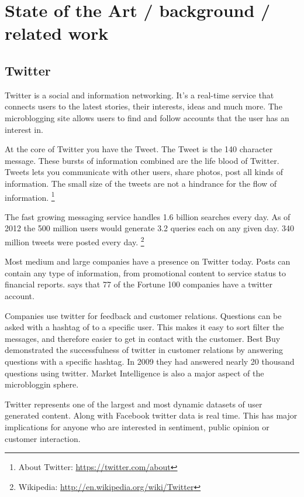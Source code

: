 \section{State of the Art / background / related work}

\subsection{Twitter}
Twitter is a social and information networking. It's a real-time service that
connects users to the latest stories, their interests, ideas and much more. The
microblogging site allows users to find and follow accounts that the user has
an interest in. 

At the core of Twitter you have the Tweet. The Tweet is the 140 character
message. These bursts of information combined are the life blood of Twitter.
Tweets lets you communicate with other users, share photos, post all kinds of
information. The small size of the tweets are not a hindrance for the flow of
information. 
\footnote{About Twitter: \url{https://twitter.com/about}}

The fast growing messaging service handles 1.6 billion searches every day.
As of 2012 the 500 million users would generate 3.2 queries each on any given
day. 340 million tweets were posted every day. 
\footnote{Wikipedia: \url{http://en.wikipedia.org/wiki/Twitter}} 

Most medium and large companies have a presence on Twitter today. Posts can contain
any type of information, from promotional content to service status to
financial reports. \cite[p8]{annikajubbega11:twitter_driver_stock_price} says
that 77 of the Fortune 100 companies have a twitter account. 

Companies use twitter for feedback and customer relations. Questions can be
asked with a hashtag of to a specific user. This makes it easy to sort filter
the messages, and therefore easier to get in contact with the customer. Best
Buy demonstrated the successfulness of twitter in customer relations by
answering questions with a specific hashtag. In 2009 they had answered nearly
20 thousand questions using twitter. \cite[p1]{Li2013206}
Market Intelligence is also a major aspect of the microbloggin sphere.

Twitter represents one of the largest and most dynamic datasets of user
generated content. Along with Facebook twitter data is real time. This has major
implications for anyone who are interested in sentiment, public opinion or
customer interaction. \cite[]{sperious11}

